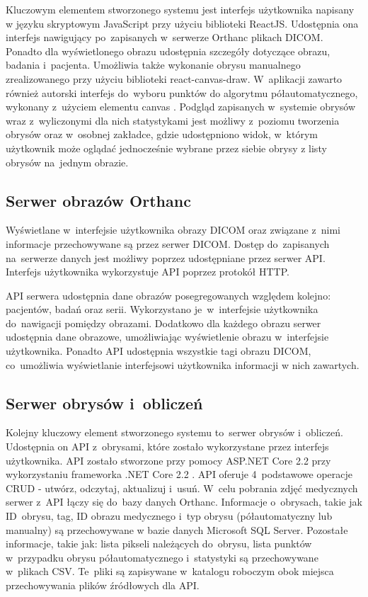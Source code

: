 \documentclass[a4paper,11pt,twoside,openright]{report}
\theoremstyle{definition}
\begin{document}
Kluczowym elementem stworzonego systemu jest interfejs użytkownika napisany w
języku skryptowym JavaScript przy użyciu biblioteki ReactJS. Udostępnia ona
interfejs nawigujący po~zapisanych w~serwerze Orthanc plikach DICOM. Ponadto dla
wyświetlonego obrazu udostępnia szczegóły dotyczące obrazu, badania i~pacjenta.
Umożliwia także wykonanie obrysu manualnego zrealizowanego przy użyciu biblioteki
react-canvas-draw. W~aplikacji zawarto również autorski interfejs do~wyboru punktów
do algorytmu półautomatycznego, wykonany z~użyciem elementu canvas \cite{Canvas}.
Podgląd zapisanych w~systemie obrysów wraz z~wyliczonymi dla nich statystykami
jest możliwy z~poziomu tworzenia obrysów oraz w~osobnej zakładce, gdzie udostępniono
widok, w~którym użytkownik może oglądać jednocześnie wybrane przez siebie obrysy
z listy obrysów na~jednym obrazie.

\subsection {Serwer obrazów Orthanc}

Wyświetlane w~interfejsie użytkownika obrazy DICOM oraz związane z~nimi informacje
przechowywane są przez serwer DICOM. Dostęp do~zapisanych na~serwerze danych jest
możliwy poprzez udostępniane przez serwer API. Interfejs użytkownika wykorzystuje
API poprzez protokół HTTP.

API serwera udostępnia dane obrazów posegregowanych względem kolejno: pacjentów,
badań oraz serii. Wykorzystano je~w~interfejsie użytkownika do~nawigacji pomiędzy
obrazami. Dodatkowo dla każdego obrazu serwer udostępnia dane obrazowe, umożliwiając
wyświetlenie obrazu w~interfejsie użytkownika. Ponadto API udostępnia wszystkie
tagi obrazu DICOM, co~umożliwia wyświetlanie interfejsowi użytkownika informacji
w nich zawartych.

\subsection {Serwer obrysów i~obliczeń}
Kolejny kluczowy element stworzonego systemu to~serwer obrysów i~obliczeń. Udostępnia
on API z~obrysami, które zostało wykorzystane przez interfejs użytkownika. API zostało
stworzone przy pomocy ASP.NET Core 2.2 \cite{ASPNET} przy wykorzystaniu frameworka
.NET Core 2.2 \cite{Charakterystyka dotnet}. API oferuje 4~podstawowe operacje CRUD
- utwórz, odczytaj, aktualizuj i~usuń. W~celu pobrania zdjęć medycznych serwer z~API
łączy się do~bazy danych Orthanc. Informacje o~obrysach, takie jak ID~obrysu, tag,
ID obrazu medycznego i~typ obrysu (półautomatyczny lub manualny) są przechowywane
w bazie danych Microsoft SQL Server. Pozostałe informacje, takie jak: lista pikseli
należących do~obrysu, lista punktów w~przypadku obrysu półautomatycznego i~statystyki
są przechowywane w~plikach CSV. Te~pliki są zapisywane w~katalogu roboczym obok
miejsca przechowywania plików źródłowych dla API.
\end{document}
